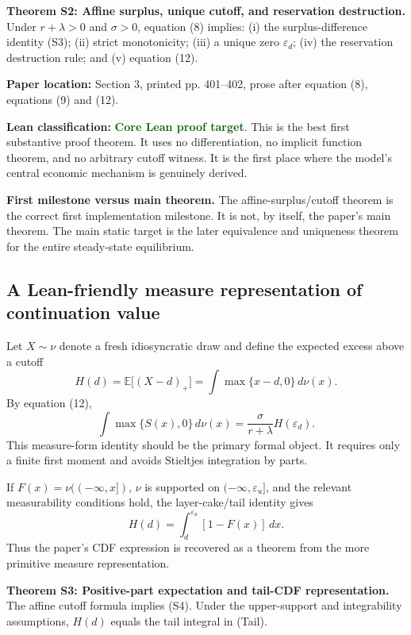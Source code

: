 \documentclass[11pt]{article}
\newcommand{\epsd}{\varepsilon_d}
\newcommand{\epsu}{\varepsilon_u}
\newcommand{\E}{\mathbb{E}}
\newcommand{\paperloc}[1]{\textbf{Paper location:} #1}
\newcommand{\leanclass}[1]{\textbf{Lean classification:} #1}
\newcommand{\core}{\textcolor{darkGreen}{\textbf{Core Lean proof target}}}
\newcommand{\statusbox}[2]{\vspace{2pt}\noindent\colorbox{#1}{\parbox{0.955\linewidth}{\small #2}}\vspace{2pt}}
\newcommand{\resultname}[1]{\medskip\noindent\textbf{#1.}}
\begin{document}
\resultname{Theorem S2: Affine surplus, unique cutoff, and reservation destruction}
Under $r+\lambda>0$ and $\sigma>0$, equation (8) implies: (i) the surplus-difference identity (S3); (ii) strict monotonicity; (iii) a unique zero $\epsd$; (iv) the reservation destruction rule; and (v) equation (12).

\paperloc{Section 3, printed pp. 401--402, prose after equation (8), equations (9) and (12).}

\leanclass{\core.}
This is the best first substantive proof theorem. It uses no differentiation, no implicit function theorem, and no arbitrary cutoff witness. It is the first place where the model's central economic mechanism is genuinely derived.

\statusbox{paleBlue}{\textbf{First milestone versus main theorem.} The affine-surplus/cutoff theorem is the correct first implementation milestone. It is not, by itself, the paper's main theorem. The main static target is the later equivalence and uniqueness theorem for the entire steady-state equilibrium.}

\subsection{A Lean-friendly measure representation of continuation value}

Let $X\sim\nu$ denote a fresh idiosyncratic draw and define the expected excess above a cutoff
\begin{equation}
 H(d)=\E\bigl[(X-d)_{+}\bigr]
 =\int \max\{x-d,0\}\,d\nu(x). \tag{H}
\end{equation}
By equation (12),
\begin{equation}
 \int \max\{S(x),0\}\,d\nu(x)
 =\frac{\sigma}{r+\lambda}H(\epsd). \tag{S4}
\end{equation}
This measure-form identity should be the primary formal object. It requires only a finite first moment and avoids Stieltjes integration by parts.

If $F(x)=\nu(( -\infty,x])$, $\nu$ is supported on $(-\infty,\epsu]$, and the relevant measurability conditions hold, the layer-cake/tail identity gives
\begin{equation}
 H(d)=\int_d^{\epsu}[1-F(x)]\,dx. \tag{Tail}
\end{equation}
Thus the paper's CDF expression is recovered as a theorem from the more primitive measure representation.

\resultname{Theorem S3: Positive-part expectation and tail-CDF representation}
The affine cutoff formula implies (S4). Under the upper-support and integrability assumptions, $H(d)$ equals the tail integral in (Tail).
\end{document}
